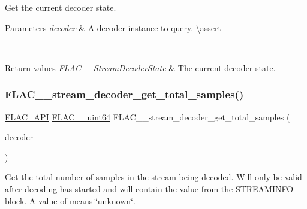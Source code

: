 Get the current decoder state.


\begin{DoxyParams}{Parameters}
{\em decoder} & A decoder instance to query. \textbackslash{}assert 
\begin{DoxyCode}{1}
\end{DoxyCode}
 \\
\hline
\end{DoxyParams}

\begin{DoxyRetVals}{Return values}
{\em F\+L\+A\+C\+\_\+\+\_\+\+Stream\+Decoder\+State} & The current decoder state. \\
\hline
\end{DoxyRetVals}
\mbox{\label{group__flac__stream__decoder_ga68a80ea677bf4abb535abd8f28f2183c}} 
\subsubsection{\texorpdfstring{FLAC\_\_stream\_decoder\_get\_total\_samples()}{FLAC\_\_stream\_decoder\_get\_total\_samples()}}
{\footnotesize\ttfamily \mbox{\hyperlink{group__flac__export_ga56ca07df8a23310707732b1c0007d6f5}{F\+L\+A\+C\+\_\+\+A\+PI}} \mbox{\hyperlink{ordinals_8h_aa78c8c70a3eb8a58af7436f278acde8e}{F\+L\+A\+C\+\_\+\+\_\+uint64}} F\+L\+A\+C\+\_\+\+\_\+stream\+\_\+decoder\+\_\+get\+\_\+total\+\_\+samples (\begin{DoxyParamCaption}\item[{const \mbox{\hyperlink{struct_f_l_a_c_____stream_decoder}{F\+L\+A\+C\+\_\+\+\_\+\+Stream\+Decoder}} $\ast$}]{decoder }\end{DoxyParamCaption})}

Get the total number of samples in the stream being decoded. Will only be valid after decoding has started and will contain the value from the {\ttfamily S\+T\+R\+E\+A\+M\+I\+N\+FO} block. A value of {} means \char`\"{}unknown\char`\"{}.


